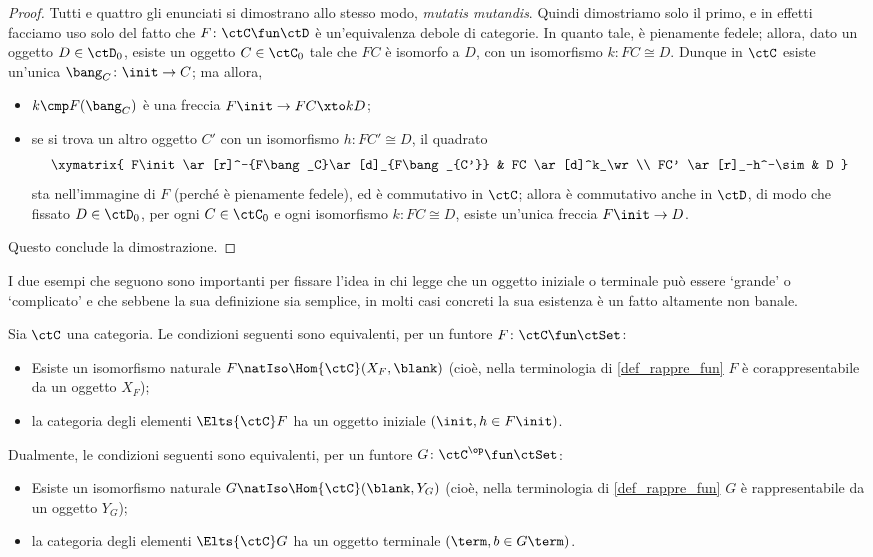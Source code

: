 \begin{proof}
	Tutti e quattro gli enunciati si dimostrano allo stesso modo, \emph{mutatis mutandis}. Quindi dimostriamo solo il primo, e in effetti facciamo uso solo del fatto che \(F \colon \ctC \fun \ctD\) è un'equivalenza debole di categorie. In quanto tale, è pienamente fedele; allora, dato un oggetto \(D\in\ctD_0\), esiste un oggetto \(C\in\ctC_0\) tale che \(FC\) è isomorfo a \(D\), con un isomorfismo \(k \colon FC \cong D\). Dunque in \(\ctC\) esiste un'unica \(\bang_C \colon \init \to C\); ma allora,
	\begin{itemize}
		\item \(k\cmp F(\bang_C)\) è una freccia \(F\init \to FC \xto k D\);
		\item se si trova un altro oggetto \(C'\) con un isomorfismo \(h \colon FC'\cong D\), il quadrato
		      \[\xymatrix{
			      F\init\ar[r]^-{F\bang_C}\ar[d]_{F\bang_{C'}} & FC \ar[d]^k_\wr \\
			      FC' \ar[r]_-h^-\sim & D
			      }\]
		      sta nell'immagine di \(F\) (perché è pienamente fedele), ed è commutativo in \(\ctC\); allora è commutativo anche in \(\ctD\), di modo che fissato \(D\in\ctD_0\), per ogni \(C\in \ctC_0\) e ogni isomorfismo \(k \colon FC \cong D\), esiste un'unica freccia \(F\init\to D\).
	\end{itemize}
	Questo conclude la dimostrazione.
\end{proof}
I due esempi che seguono sono importanti per fissare l'idea in chi legge che un oggetto iniziale o terminale può essere `grande' o `complicato' e che sebbene la sua definizione sia semplice, in molti casi concreti la sua esistenza è un fatto altamente non banale.
\begin{proposition}\label{init_term_elements}
	Sia \(\ctC\) una categoria. Le condizioni seguenti sono equivalenti, per un funtore \(F \colon \ctC \fun\ctSet\):
	\begin{itemize}
		\item Esiste un isomorfismo naturale \(F\natIso \Hom{\ctC}(X_F,\blank)\) (cioè, nella terminologia di \ref{def_rappre_fun} \(F\) è corappresentabile da un oggetto \(X_F\));
		\item la categoria degli elementi \(\Elts{\ctC}F\) ha un oggetto iniziale \((\init,h\in F\init)\).
	\end{itemize}
	Dualmente, le condizioni seguenti sono equivalenti, per un funtore \(G \colon \ctC^\op \fun\ctSet\):
	\begin{itemize}
		\item Esiste un isomorfismo naturale \(G\natIso \Hom{\ctC}(\blank,Y_G)\) (cioè, nella terminologia di \ref{def_rappre_fun} \(G\) è rappresentabile da un oggetto \(Y_G\));
		\item la categoria degli elementi \(\Elts{\ctC}G\) ha un oggetto terminale \((\term,b\in G\term)\).
	\end{itemize}
\end{proposition}
